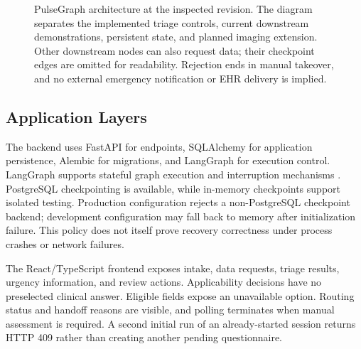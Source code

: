 \documentclass[conference]{IEEEtran}
\begin{document}
\begin{figure}[t]
\caption{PulseGraph architecture at the inspected revision. The diagram separates the implemented triage controls, current downstream demonstrations, persistent state, and planned imaging extension. Other downstream nodes can also request data; their checkpoint edges are omitted for readability. Rejection ends in manual takeover, and no external emergency notification or EHR delivery is implied.}
\label{fig:architecture}
\end{figure}
\subsection{Application Layers}
The backend uses FastAPI for endpoints, SQLAlchemy for application persistence, Alembic for migrations, and LangGraph for execution control. LangGraph supports stateful graph execution and interruption mechanisms \cite{langgraph}. PostgreSQL checkpointing is available, while in-memory checkpoints support isolated testing. Production configuration rejects a non-PostgreSQL checkpoint backend; development configuration may fall back to memory after initialization failure. This policy does not itself prove recovery correctness under process crashes or network failures.

The React/TypeScript frontend exposes intake, data requests, triage results, urgency information, and review actions. Applicability decisions have no preselected clinical answer. Eligible fields expose an unavailable option. Routing status and handoff reasons are visible, and polling terminates when manual assessment is required. A second initial run of an already-started session returns HTTP 409 rather than creating another pending questionnaire.
\end{document}
